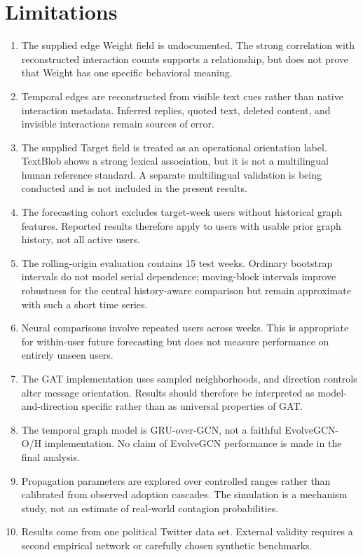 \documentclass[11pt,a4paper]{article}
\begin{document}
\section{Limitations}
\begin{enumerate}[leftmargin=7mm]
\item The supplied edge Weight field is undocumented. The strong correlation with reconstructed interaction counts supports a relationship, but does not prove that Weight has one specific behavioral meaning.
\item Temporal edges are reconstructed from visible text cues rather than native interaction metadata. Inferred replies, quoted text, deleted content, and invisible interactions remain sources of error.
\item The supplied Target field is treated as an operational orientation label. TextBlob shows a strong lexical association, but it is not a multilingual human reference standard. A separate multilingual validation is being conducted and is not included in the present results.
\item The forecasting cohort excludes target-week users without historical graph features. Reported results therefore apply to users with usable prior graph history, not all active users.
\item The rolling-origin evaluation contains 15 test weeks. Ordinary bootstrap intervals do not model serial dependence; moving-block intervals improve robustness for the central history-aware comparison but remain approximate with such a short time series.
\item Neural comparisons involve repeated users across weeks. This is appropriate for within-user future forecasting but does not measure performance on entirely unseen users.
\item The GAT implementation uses sampled neighborhoods, and direction controls alter message orientation. Results should therefore be interpreted as model-and-direction specific rather than as universal properties of GAT.
\item The temporal graph model is GRU-over-GCN, not a faithful EvolveGCN-O/H implementation. No claim of EvolveGCN performance is made in the final analysis.
\item Propagation parameters are explored over controlled ranges rather than calibrated from observed adoption cascades. The simulation is a mechanism study, not an estimate of real-world contagion probabilities.
\item Results come from one political Twitter data set. External validity requires a second empirical network or carefully chosen synthetic benchmarks.
\end{enumerate}
\end{document}
